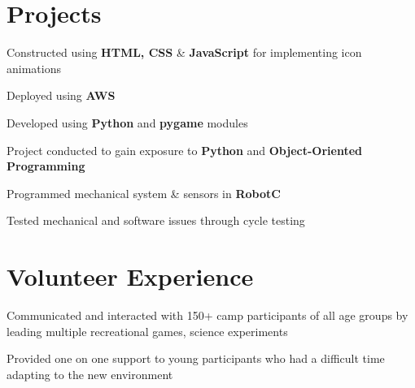 \documentclass[]{morris-cv}
\begin{document}
\begin{minipage}[t]{0.67\textwidth}

\section{Projects}
\descript{}
\location{}
\begin{tightemize}
    \item Constructed using \textbf{HTML, CSS} \& \textbf{JavaScript} for implementing icon animations
    \item Deployed using \textbf{AWS}
\end{tightemize}
\sectionsep

\descript{}
\location{}
\begin{tightemize}
    \item Developed using \textbf{Python} and \textbf{pygame} modules
    \item Project conducted to gain exposure to \textbf{Python} and \textbf{Object-Oriented Programming}
\end{tightemize}
\sectionsep

\descript{}
\location{}
\begin{tightemize}
    \item Programmed mechanical system \& sensors in \textbf{RobotC}
    \item Tested mechanical and software issues through cycle testing
\end{tightemize}
\sectionsep


\section{Volunteer Experience}
\begin{tightemize}
    \item Communicated and interacted with 150+ camp participants of all age groups by leading multiple recreational games, science experiments
    \item Provided one on one support to young participants who had a difficult time adapting to the new environment
\end{tightemize}
\sectionsep
\end{minipage} 
\end{document}

